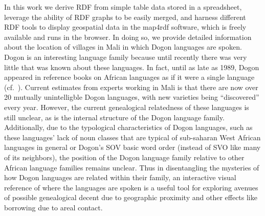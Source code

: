 In this work we derive RDF from simple table data stored in a spreadsheet, leverage the ability of RDF graphs to be easily merged, and harness different RDF tools to display geospatial data in the map4rdf software, which is freely available and runs in the browser. In doing so, we provide detailed information about the location of villages in Mali in which Dogon languages are spoken. Dogon is an interesting language family because until recently there was very little that was known about these languages. In fact, until as late as 1989, Dogon appeared in reference books on African languages as if it were a single language (cf.\ \citep{Bendor-Samuel_etal1989,Blench2005}). Current estimates from experts working in Mali is that there are now over 20 mutually unintelligble Dogon languages, with new varieties being ``discovered'' every year. However, the current genealogical relatedness of these languages is still unclear, as is the internal structure of the Dogon language family. Additionally, due to the typological characteristics of Dogon languages, such as these languages' lack of noun classes that are typical of sub-saharan West African languages in general or Dogon's SOV basic word order (instead of SVO like many of its neighbors), the position of the Dogon language family relative to other African language families remains unclear. Thus in disentangling the mysteries of how Dogon languages are related within their family, an interactive visual reference of where the languages are spoken is a useful tool for exploring avenues of possible genealogical decent due to geographic proximity and other effects like borrowing due to areal contact.
